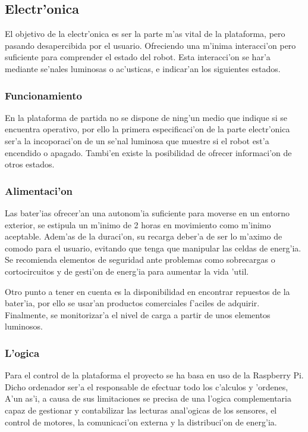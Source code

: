 \documentclass[twoside]{article}
\begin{document}
\subsection{Electr'onica}
El objetivo de la electr'onica es ser la parte m'as vital de la plataforma, pero pasando desapercibida por el usuario. Ofreciendo una m'inima interacci'on pero suficiente para comprender el estado del robot. Esta interacci'on se har'a mediante se'nales luminosas o ac'usticas, e indicar'an los siguientes estados.

\subsubsection{Funcionamiento}
En la plataforma de partida no se dispone de ning'un medio que indique si se encuentra operativo, por ello la primera especificaci'on de la parte electr'onica ser'a la incoporaci'on de un se'nal luminosa que muestre si el robot est'a encendido o apagado. Tambi'en existe la posibilidad de ofrecer informaci'on de otros estados.

\subsubsection{Alimentaci'on}
Las bater'ias ofrecer'an  una autonom'ia suficiente para moverse en un entorno exterior, se estipula un m'inimo de 2 horas en movimiento como m'inimo aceptable. Adem'as de la duraci'on, su recarga deber'a de ser lo m'aximo de comodo para el usuario, evitando que tenga que manipular las celdas de energ'ia. Se recomienda elementos de seguridad ante problemas como sobrecargas o cortocircuitos y de gesti'on de energ'ia para aumentar la vida 'util.

Otro punto a tener en cuenta es la disponibilidad en encontrar repuestos de la bater'ia, por ello se usar'an productos comerciales f'aciles de adquirir. Finalmente, se monitorizar'a el nivel de carga a partir de unos elementos luminosos.

\subsubsection{L'ogica}
Para el control de la plataforma el proyecto se ha basa en uso de la Raspberry Pi. Dicho ordenador ser'a el responsable de efectuar todo los c'alculos y 'ordenes, A'un as'i, a causa de sus limitaciones se precisa de una l'ogica complementaria capaz de gestionar y contabilizar las lecturas anal'ogicas de los sensores, el control de motores, la comunicaci'on externa y la distribuci'on de energ'ia.
\end{document}
